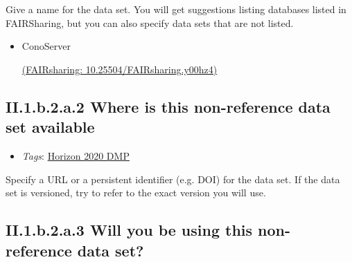 \documentclass[a4paper,12pt]{report}
\begin{document}
\noindent
\begin{markdown}
Give a name for the data set. You will get suggestions listing databases listed in FAIRSharing, but you can also specify data sets that are not listed.
\end{markdown}



\begin{itemize}
  \item[\CheckmarkBold]
  \begin{markdown}
  ConoServer
  \end{markdown}
  \href{https://fairsharing.org/10.25504/FAIRsharing.y00hz4}{(FAIRsharing: 10.25504/FAIRsharing.y00hz4)}
  
\end{itemize}


\subsection*{\protect\textcolor{colorSecId}{II.1.b.2.a.2} Where is this non-reference data set available}

\label{82fd0cce-2b41-423f-92ad-636d0872045c.efc80cc8-8318-4f8c-acb7-dc1c60e491c1.2663b978-5125-4224-9930-0a50dbe895c9.be872000-cb98-442f-999c-ca3ef58dcfe8.c8bd43ef-4b52-48d9-be2a-7f51dad8d3c4.5f73797c-268a-4862-b48b-75719ff47709}


\begin{itemize}
  \item \textit{Tags}: \ul{Horizon 2020 DMP}
  \end{itemize}


\noindent
\begin{markdown}
Specify a URL or a persistent identifier (e.g. DOI) for the data set. If the data set is versioned, try to refer to the exact version you will use.
\end{markdown}




\subsection*{\protect\textcolor{colorSecId}{II.1.b.2.a.3} Will you be using this non-reference data set?}
\end{document}
